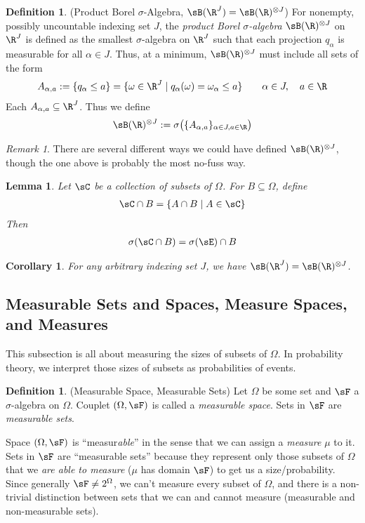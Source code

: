 \documentclass[12pt]{article}
\theoremstyle{plain}
\newtheorem{lem}[thm]{Lemma}
\newtheorem{cor}[thm]{Corollary}
\theoremstyle{definition}
\newtheorem{defn}[thm]{Definition}
\theoremstyle{remark}
\newtheorem*{rmk}{Remark}
\begin{document}
\begin{defn}
(Product Borel $\sigma$-Algebra, $\sB(\R^J)=\sB(\R)^{\otimes J}$)
For nonempty, possibly uncountable indexing set $J$,
the \emph{product Borel $\sigma$-algebra} $\sB(\R)^{\otimes J}$ on
$\R^J$ is defined as the smallest $\sigma$-algebra on $\R^J$ such that
each projection $q_\alpha$ is measurable for all $\alpha\in J$.
Thus, at a minimum, $\sB(\R)^{\otimes J}$ must include all sets of the
form
\begin{align*}
  A_{\alpha,a} :=
  \{q_\alpha \leq a\} =
  \{\omega \in \R^J \;|\; q_\alpha(\omega)=\omega_\alpha \leq a\}
  \qquad \alpha \in J,\quad a \in\R
\end{align*}
Each $A_{\alpha,a}\subseteq \R^J$. Thus we define
\begin{align*}
  \sB(\R)^{\otimes J}
  := \sigma\big( \{A_{\alpha,a}\}_{\alpha \in J, a\in\R}\big)
\end{align*}
\end{defn}
\begin{rmk}
There are several different ways we could have defined
$\sB(\R)^{\otimes J}$, though the one above is probably the most no-fuss
way.
\end{rmk}

\begin{lem}
Let $\sC$ be a collection of subsets of $\Omega$. For $B\subseteq
\Omega$, define
\begin{align*}
  \sC \cap B = \{A \cap B \;|\; A \in \sC\}
\end{align*}
Then
\begin{align*}
  \sigma(\sC\cap B) = \sigma(\sE) \cap B
\end{align*}
\end{lem}
\begin{cor}
For any arbitrary indexing set $J$, we have
$\sB(\R^J)=\sB(\R)^{\otimes J}$.
\end{cor}


\clearpage
\subsection{Measurable Sets and Spaces, Measure Spaces, and Measures}

This subsection is all about measuring the sizes of subsets of $\Omega$.
In probability theory, we interpret those sizes of subsets as
probabilities of events.

\begin{defn}(Measurable Space, Measurable Sets)
Let $\Omega$ be some set and $\sF$ a $\sigma$-algebra on
$\Omega$. Couplet $(\Omega, \sF)$ is called a
\emph{measurable space}. Sets in $\sF$ are
\emph{measurable sets}.

Space $(\Omega,\sF)$ is ``measur\emph{able}'' in the sense that we can
assign a \emph{measure} $\mu$ to it.
Sets in $\sF$ are ``measurable sets'' because they represent only those
subsets of $\Omega$ that we \emph{are able to measure} ($\mu$ has domain
$\sF$) to get us a size/probability. Since generally $\sF\neq 2^\Omega$,
we can't measure every subset of $\Omega$, and there is a non-trivial
distinction between sets that we can and cannot measure (measurable and
non-measurable sets).
\end{defn}
\end{document}
